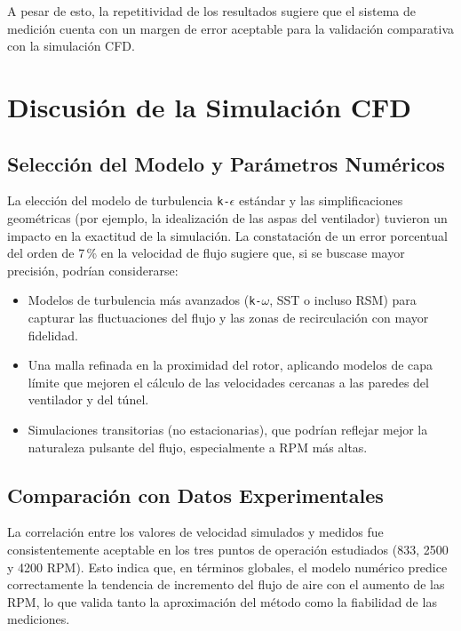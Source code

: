 A pesar de esto, la repetitividad de los resultados sugiere que el sistema de medición cuenta con un margen de error aceptable para la validación comparativa con la simulación CFD.

\section{Discusión de la Simulación CFD}
\subsection{Selección del Modelo y Parámetros Numéricos}
La elección del modelo de turbulencia \texttt{k-$\epsilon$} estándar y las simplificaciones geométricas (por ejemplo, la idealización de las aspas del ventilador) tuvieron un impacto en la exactitud de la simulación. La constatación de un error porcentual del orden de 7\,\% en la velocidad de flujo sugiere que, si se buscase mayor precisión, podrían considerarse:
\begin{itemize}
    \item Modelos de turbulencia más avanzados (\texttt{k-$\omega$}, SST o incluso RSM) para capturar las fluctuaciones del flujo y las zonas de recirculación con mayor fidelidad.
    \item Una malla refinada en la proximidad del rotor, aplicando modelos de capa límite que mejoren el cálculo de las velocidades cercanas a las paredes del ventilador y del túnel.
    \item Simulaciones transitorias (no estacionarias), que podrían reflejar mejor la naturaleza pulsante del flujo, especialmente a RPM más altas.
\end{itemize}

\subsection{Comparación con Datos Experimentales}
La correlación entre los valores de velocidad simulados y medidos fue consistentemente aceptable en los tres puntos de operación estudiados (833, 2500 y 4200 RPM). Esto indica que, en términos globales, el modelo numérico predice correctamente la tendencia de incremento del flujo de aire con el aumento de las RPM, lo que valida tanto la aproximación del método como la fiabilidad de las mediciones.

